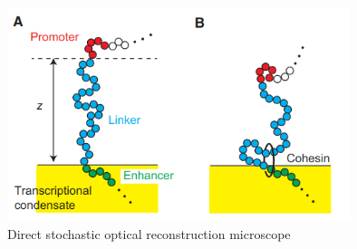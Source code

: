 \documentclass{article}
\begin{document}
\clearpage
\begin{figure}
\centering
\includegraphics[width=10cm]{Model.png}
\caption{Direct stochastic optical reconstruction microscope}
\end{figure}

\cite{Ensign2010}



 
\end{document}
